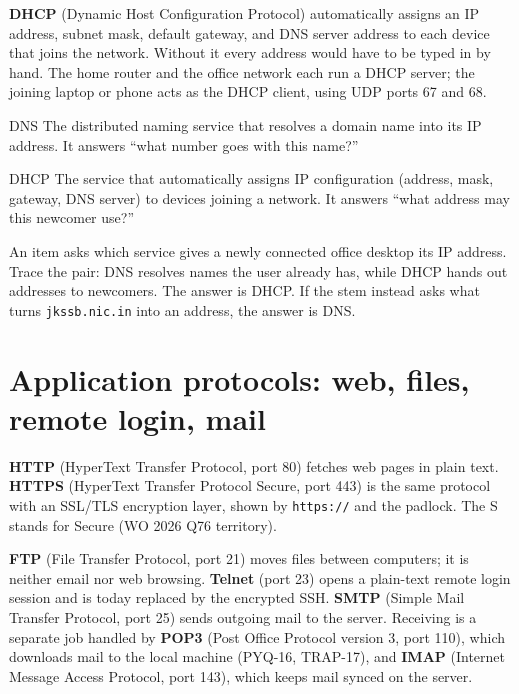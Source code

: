 \textbf{DHCP} (Dynamic Host Configuration Protocol) automatically assigns an
IP address, subnet mask, default gateway, and DNS server address to each
device that joins the network. Without it every address would have to be
typed in by hand. The home router and the office network each run a DHCP
server; the joining laptop or phone acts as the DHCP client, using UDP ports
67 and 68.

\begin{definitionbox}{DNS}
The distributed naming service that resolves a domain name into its IP
address. It answers ``what number goes with this name?''
\end{definitionbox}

\begin{definitionbox}{DHCP}
The service that automatically assigns IP configuration (address, mask,
gateway, DNS server) to devices joining a network. It answers ``what address
may this newcomer use?''
\end{definitionbox}

\begin{example}
An item asks which service gives a newly connected office desktop its IP
address. Trace the pair: DNS resolves names the user already has, while DHCP
hands out addresses to newcomers. The answer is DHCP. If the stem instead
asks what turns \texttt{jkssb.nic.in} into an address, the answer is DNS.
\end{example}

\section{Application protocols: web, files, remote login, mail}
\textbf{HTTP} (HyperText Transfer Protocol, port 80) fetches web pages in
plain text. \textbf{HTTPS} (HyperText Transfer Protocol Secure, port 443) is
the same protocol with an SSL/TLS encryption layer, shown by
\texttt{https://} and the padlock. The S stands for Secure (WO 2026 Q76
territory).

\textbf{FTP} (File Transfer Protocol, port 21) moves files between computers;
it is neither email nor web browsing. \textbf{Telnet} (port 23) opens a
plain-text remote login session and is today replaced by the encrypted SSH.
\textbf{SMTP} (Simple Mail Transfer Protocol, port 25) sends outgoing mail to
the server. Receiving is a separate job handled by \textbf{POP3} (Post Office
Protocol version 3, port 110), which downloads mail to the local machine
(PYQ-16, TRAP-17), and \textbf{IMAP} (Internet Message Access Protocol, port
143), which keeps mail synced on the server.

